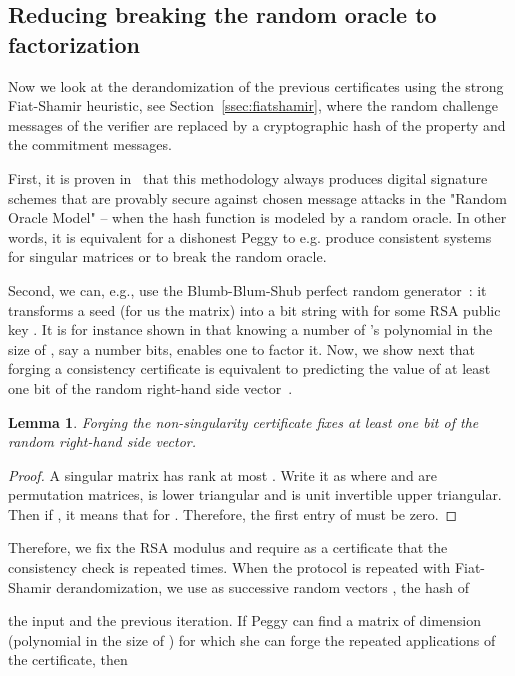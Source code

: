 \documentclass{article}
\newtheorem{lemma}{Lemma}
\begin{document}
\subsection{Reducing breaking the random oracle to
  factorization}\label{ssec:bbs}
Now we look at the derandomization of the previous certificates using the strong
Fiat-Shamir heuristic, see Section~\ref{ssec:fiatshamir},
where the random challenge messages of the verifier are replaced by a
cryptographic hash of the property and the commitment messages.

First, it is proven in~\cite{Pointcheval:1996:provsecsign}
that this methodology always produces digital signature schemes that
are provably secure against chosen message attacks in the "Random
Oracle Model" -- when the hash function is modeled by a random
oracle. 
In other words, it is equivalent for a dishonest Peggy to e.g. produce
consistent systems for singular matrices or to break the random oracle.

Second, we can, e.g., use the Blumb-Blum-Shub perfect
random generator~\cite{Blum:1982:BBS}:
it transforms a seed  (for us the matrix) into a bit string
 with  for some
RSA public key . 
It is for instance shown in \cite{Fischlin:1997:SSP} that
knowing a number of 's polynomial in the size of , say
a number   
bits, enables one to factor it. 
Now, we show next that forging a consistency certificate
 is equivalent
to predicting the value of at least one bit of the random right-hand
side vector~. 
\begin{lemma} 
  Forging the non-singularity certificate fixes at least one bit of the random
  right-hand side vector.
\end{lemma}
\begin{proof}
  A singular matrix  has rank at most .
  Write it as
   where  and 
  are permutation matrices,  is lower
  triangular and  is unit invertible upper triangular. Then if , 
  it means that  
   for
  . Therefore, the first entry of  must be zero.
\end{proof}

Therefore, we fix the RSA modulus  and require as a certificate
that the consistency check is repeated  times. 
When the protocol is repeated with Fiat-Shamir derandomization,
we use as successive random vectors , the hash of 
 
 
the input and the previous iteration.
If Peggy can find a matrix  of dimension  (polynomial in the size of )
for which she can forge the  repeated applications of the certificate, then
 
\end{document}
